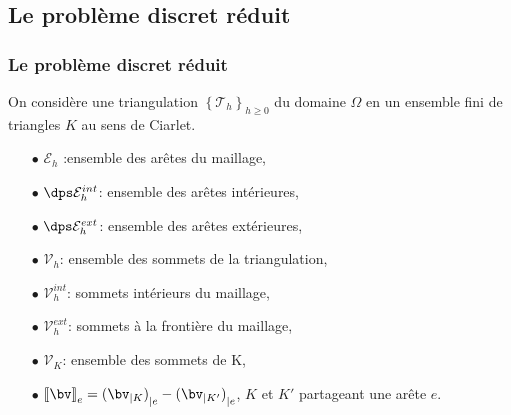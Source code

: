 \documentclass{beamer}
\begin{document}
\subsection{Le problème discret réduit}
\begin{frame}
\frametitle{Le problème discret réduit}
\begin{notation}
On considère une triangulation $\left\{{\mathcal{T}}_h\right\}_{h\geq 0}$ du domaine $\Omega$ en un ensemble fini de triangles $K$ au sens de Ciarlet.
\begin{itemize}
\item[$\bullet$] $\mathcal{E}_h$ :ensemble des arêtes du maillage, 
\item[$\bullet$]$ \dps \mathcal{E}_h^{int}$:  ensemble des arêtes intérieures, 
\item[$\bullet$] $\dps \mathcal{E}_h^{ext}$:  ensemble des arêtes extérieures,
\item[$\bullet$]${\mathcal{V}}_h$: ensemble des sommets de la triangulation,
\item[$\bullet$]${\mathcal{V}}_h^{int}$: sommets intérieurs du maillage,
\item[$\bullet$] ${\mathcal{V}}_h^{ext}$: sommets à la frontière du maillage,
\item[$\bullet$] $\mathcal{V}_K$: ensemble des sommets de K,
\item[$\bullet$] ${\llbracket \bv \rrbracket}_{e}={(\bv_{|K})}_{|e}-{(\bv_{|K'})}_{|e}$, $K$ et $K'$ partageant une arête $e$.
\label{ref: maillage_domaine}
\end{itemize} 
\end{notation}
\end{frame}
\end{document}
